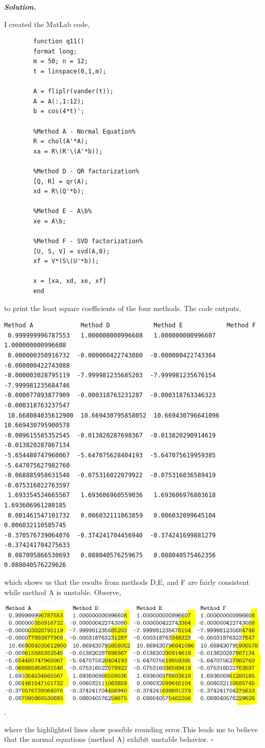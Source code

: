 \documentclass[12pt]{report}
\newenvironment{solution}[1][\it{Solution}]{\textbf{#1. } }{$\square$}
\begin{document}
\begin{solution}
    
    \noindent
    I created the MatLab code, 
    \begin{verbatim}
        function q11()
        format long;
        m = 50; n = 12;
        t = linspace(0,1,m);
        
        A = fliplr(vander(t));
        A = A(:,1:12);
        b = cos(4*t)';
        
        %Method A - Normal Equation%
        R = chol(A'*A);
        xa = R\(R'\(A'*b));
        
        %Method D - QR factorization%
        [Q, R] = qr(A);
        xd = R\(Q'*b);
        
        %Method E - A\b%
        xe = A\b;
        
        %Method F - SVD factorization%
        [U, S, V] = svd(A,0);
        xf = V*(S\(U'*b));
        
        x = [xa, xd, xe, xf]
        end
    \end{verbatim}
    \pagebreak
    to print the least square coefficients of the four methods. The code outputs,
    \begin{verbatim}
Method A             Method D            Method E            Method F
 0.999999996787553   1.000000000996608   1.000000000996607   1.000000000996608
 0.000000350916732  -0.000000422743080  -0.000000422743364  -0.000000422743088
-8.000003028795119  -7.999981235685203  -7.999981235676154  -7.999981235684746
-0.000077893877909  -0.000318763231287  -0.000318763346323  -0.000318763237547
 10.668084035612900  10.669430795858052  10.669430796641096  10.669430795900578
-0.009615585352545  -0.013820287698367  -0.013820290914619  -0.013820287867134
-5.654480747960067  -5.647075628404193  -5.647075619959385  -5.647075627982760
-0.068885958631546  -0.075316022079922  -0.075316036589419  -0.075316022763597
 1.693354534665567   1.693606960559036   1.693606976803618   1.693606961280185
 0.001461547101732   0.006032111063859   0.006032099645104   0.006032110585745
-0.370576739064076  -0.374241704456940  -0.374241699881279  -0.374241704275633
 0.087095866530693   0.088040576259675   0.088040575462356   0.088040576229626 
    \end{verbatim}
    which shows us that the results from methods D,E, and F are fairly consistent while method A is unstable. Observe,
    \begin{center}
        \includegraphics[width=.8\textwidth]{data.JPG}.
    \end{center} 
    where the highlighted lines show possible rounding error.This leads me to believe that the normal equations (method A) exhibit unstable behavior. 
\end{solution}
\end{document}
